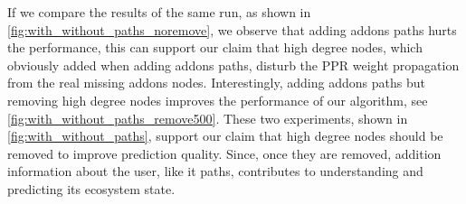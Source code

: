\documentclass[11pt,oneside]{book}
\begin{document}

If we compare the results of the same run, as shown in
\autoref{fig:with_without_paths_noremove}, we observe that adding
addons paths hurts the performance, this can support our claim that
high degree nodes, which obviously added when adding addons paths,
disturb the PPR weight propagation from the real missing addons
nodes. Interestingly, adding addons paths but removing high degree
nodes improves the performance of our algorithm, see
\autoref{fig:with_without_paths_remove500}. These two experiments,
shown in \autoref{fig:with_without_paths}, support our claim that high
degree nodes should be removed to improve prediction quality. Since,
once they are removed, addition information about the user, like it
paths, contributes to understanding and predicting its ecosystem
state.
\end{document}
